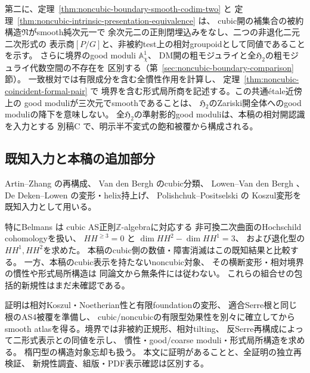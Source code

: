 \documentclass[a4paper,11pt]{ltjsarticle}
\numberwithin{equation}{section}
\theoremstyle{plain}
\theoremstyle{definition}
\theoremstyle{remark}
\newcommand{\HHstack}{\mathfrak H_2}
\begin{document}
第二に、定理~\ref{thm:noncubic-boundary-smooth-codim-two} と
定理~\ref{thm:noncubic-intrinsic-presentation-equivalence} は、
cubic開の補集合の被約構造$\mathfrak N$がsmooth純次元一で
余次元二の正則閉埋込みをなし、二つの非退化二元二次形式の
表示商$[P/G]$と、非被約test上の相対groupoidとして同値であることを示す。
さらに境界のgood moduli $\mathbb A^1_\chi$、
DM開の粗モジュライと全$\HHstack$の粗モジュライ代数空間の不存在を
区別する（第~\ref{sec:noncubic-boundary-comparison}節）。
一致根対では有限成分を含む全慣性作用を計算し、
定理~\ref{thm:noncubic-coincident-formal-pair} で
境界を含む形式局所商を記述する。この共通étale近傍上の
good moduliが三次元でsmoothであることは、
$\HHstack$のZariski開全体へのgood moduliの降下を意味しない。
全$\HHstack$の準射影的good moduliは、本稿の相対開認識を入力とする
別稿C\cite[\texttt{thm:qa-global-h2-quasiprojective-good-moduli}]{QuiverAvatarModuli2026}
で、明示半不変式の飽和被覆から構成される。

\subsection{既知入力と本稿の追加部分}
Artin--Zhang \cite{AZ1994} の再構成、
Van den Bergh \cite{VdB2011} のcubic分類、
Lowen--Van den Bergh \cite{LowenVanDenBergh2005,LowenVanDenBergh2006}、
De Deken--Lowen \cite{DeDekenLowen2011} の変形・helix持上げ、
Polishchuk--Positselski \cite{PolishchukPositselski2005} の
Koszul変形を既知入力として用いる。

特にBelmans \cite[Proposition 31, Corollary 32, Table 2]{Belmans2019} は
cubic AS正則$\mathbb Z$-algebraに対応する
非可換二次曲面のHochschild cohomologyを扱い、
$HH^{\ge3}=0$ と $\dim HH^2-\dim HH^1=3$、
および退化型の$HH^1,HH^2$を求めた。
本稿のcubic側の数値・障害消滅はこの既知結果と比較する。
一方、本稿のcubic表示を持たないnoncubic対象、
その横断変形・相対境界の慣性や形式局所構造は
同論文から無条件には従わない。
これらの組合せの包括的新規性はまだ未確認である。

証明は相対Koszul・Noetherian性と有限foundationの変形、
適合Serre根と同じ根のAS4被覆を準備し、
cubic/noncubicの有限型効果性を別々に確立してから
smooth atlasを得る。境界では非被約正規形、相対tilting、
反Serre再構成によって二形式表示との同値を示し、
慣性・good/coarse moduli・形式局所構造を求める。
楕円型の構造対象忘却も扱う。
本文に証明があることと、全証明の独立再検証、
新規性調査、組版・PDF表示確認は区別する。












\end{document}
